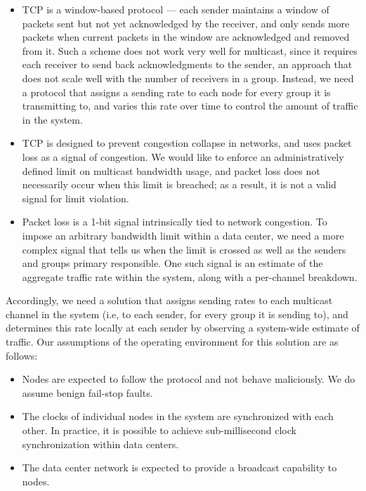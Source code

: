\begin{itemize}
\item{TCP is a window-based protocol --- each sender maintains a window of packets sent but not yet acknowledged by the receiver, and only sends more packets when current packets in the window are acknowledged and removed from it. Such a scheme does not work very well for multicast, since it requires each receiver to send back acknowledgments to the sender, an approach that does not scale well with the number of receivers in a group. Instead, we need a protocol that assigns a sending rate to each node for every group it is transmitting to, and varies this rate over time to control the amount of traffic in the system.}
\item{TCP is designed to prevent congestion collapse in networks, and uses packet loss as a signal of congestion. We would like to enforce an administratively defined limit on multicast bandwidth usage, and packet loss does not necessarily occur when this limit is breached; as a result, it is not a valid signal for limit violation.}
\item{Packet loss is a 1-bit signal intrinsically tied to network congestion. To impose an arbitrary bandwidth limit within a data center, we need a more complex signal that tells us when the limit is crossed as well as the senders and groups primary responsible. One such signal is an estimate of the aggregate traffic rate within the system, along with a per-channel breakdown.}
\end{itemize}

Accordingly, we need a solution that assigns sending rates to each multicast channel in the system (i.e, to each sender, for every group it is sending to), and determines this rate locally at each sender by observing a system-wide estimate of traffic. Our assumptions of the operating environment for this solution are as follows:
\begin{itemize}
\item{Nodes are expected to follow the protocol and not behave maliciously. We do assume benign fail-stop faults.}
\item{The clocks of individual nodes in the system are synchronized with each other. In practice, it is possible to achieve sub-millisecond clock synchronization within data centers.}
\item{The data center network is expected to provide a broadcast capability to nodes.}
\end{itemize}